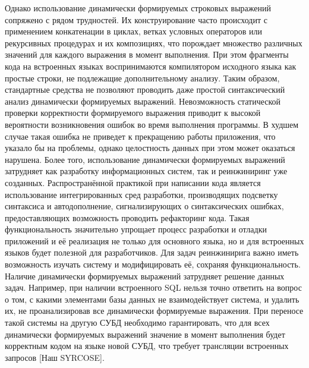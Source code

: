 Однако использование динамически формируемых строковых выражений сопряжено с рядом трудностей. Их конструирование часто происходит с применением конкатенации в циклах, ветках условных операторов или 
рекурсивных процедурах и их композициях, что порождает множество различных значений для каждого выражения в момент выполнения. При этом фрагменты кода на встроенных языках воспринимаются компилятором 
исходного языка как простые строки, не подлежащие дополнительному анализу. Таким образом, стандартные средства не позволяют проводить даже простой синтаксический анализ динамически формируемых выражений. 
Невозможность статической проверки корректности формируемого выражения приводит к высокой вероятности возникновения ошибок во время выполнения программы. В худшем случае такая ошибка не приведет к прекращению 
работы приложения, что указало бы на проблемы, однако целостность данных при этом может оказаться нарушена. Более того, использование динамически формируемых выражений затрудняет как разработку информационных 
систем, так и реинжиниринг уже созданных. Распространённой практикой при написании кода является использование интегрированных сред разработки, производящих подсветку синтаксиса и автодополнение, 
сигнализирующих о синтаксических ошибках, предоставляющих возможность проводить рефакторинг кода. Такая функциональность значительно упрощает процесс разработки и отладки приложений и её реализация не 
только для основного языка, но и для встроенных языков будет полезной для разработчиков. Для задач реинжинирига важно иметь возможность изучать систему и модифицировать её, сохраняя функциональность. 
Наличие динамически формируемых выражений затрудняет решение данных задач. Например, при наличии встроенного SQL нельзя точно ответить на вопрос о том, с какими элементами базы данных не взаимодействует система, 
и  удалить их, не проанализировав все динамически формируемые выражения. При переносе такой системы на другую СУБД необходимо гарантировать, что для всех динамически формируемых выражений значение в момент 
выполнения будет корректным кодом на языке новой СУБД, что требует трансляции встроенных запросов [Наш SYRCOSE]. 

